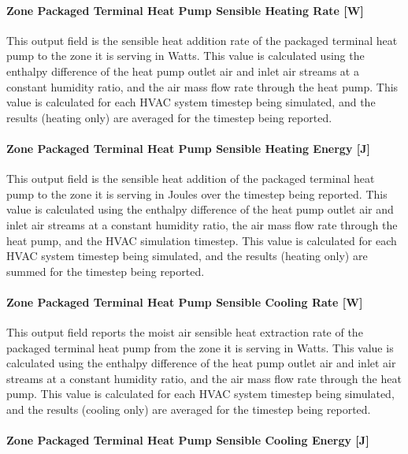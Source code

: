 \paragraph{Zone Packaged Terminal Heat Pump Sensible Heating Rate {[}W{]}}\label{zone-packaged-terminal-heat-pump-sensible-heating-rate-w}

This output field is the sensible heat addition rate of the packaged terminal heat pump to the zone it is serving in Watts. This value is calculated using the enthalpy difference of the heat pump outlet air and inlet air streams at a constant humidity ratio, and the air mass flow rate through the heat pump. This value is calculated for each HVAC system timestep being simulated, and the results (heating only) are averaged for the timestep being reported.

\paragraph{Zone Packaged Terminal Heat Pump Sensible Heating Energy {[}J{]}}\label{zone-packaged-terminal-heat-pump-sensible-heating-energy-j}

This output field is the sensible heat addition of the packaged terminal heat pump to the zone it is serving in Joules over the timestep being reported. This value is calculated using the enthalpy difference of the heat pump outlet air and inlet air streams at a constant humidity ratio, the air mass flow rate through the heat pump, and the HVAC simulation timestep. This value is calculated for each HVAC system timestep being simulated, and the results (heating only) are summed for the timestep being reported.

\paragraph{Zone Packaged Terminal Heat Pump Sensible Cooling Rate {[}W{]}}\label{zone-packaged-terminal-heat-pump-sensible-cooling-rate-w}

This output field reports the moist air sensible heat extraction rate of the packaged terminal heat pump from the zone it is serving in Watts. This value is calculated using the enthalpy difference of the heat pump outlet air and inlet air streams at a constant humidity ratio, and the air mass flow rate through the heat pump. This value is calculated for each HVAC system timestep being simulated, and the results (cooling only) are averaged for the timestep being reported.

\paragraph{Zone Packaged Terminal Heat Pump Sensible Cooling Energy {[}J{]}}\label{zone-packaged-terminal-heat-pump-sensible-cooling-energy-j}

